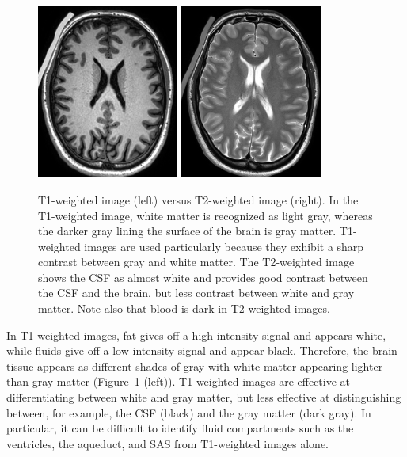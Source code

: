 \begin{figure}
  \centering
  \includegraphics[width=0.415\textwidth]{./graphics/chp2/T1-image.png}
  \includegraphics[width=0.415\textwidth]{./graphics/chp2/T2-image.png}
  \caption{T1-weighted image (left) versus T2-weighted image (right).
    In the T1-weighted image, white matter is recognized as light
    gray, whereas the darker gray lining the surface of the brain is
    gray matter. T1-weighted images are used particularly because they
    exhibit a sharp contrast between gray and white matter.  The
    T2-weighted image shows the CSF as almost white and provides good
    contrast between the CSF and the brain, but less contrast between
    white and gray matter. Note also that blood is dark in
    T2-weighted images.}
  \label{fig:chp2:t1vt2}
\end{figure}
In T1-weighted images, fat gives off a high intensity signal and
appears white, while fluids give off a low intensity signal and appear
black. Therefore, the brain tissue appears as different shades of gray
with white matter appearing lighter than gray matter
(Figure~\ref{fig:chp2:t1vt2} (left)). T1-weighted images are effective
at differentiating between white and gray matter, but less effective
at distinguishing between, for example, the CSF (black) and the gray
matter (dark gray). In particular, it can be difficult to identify
fluid compartments such as the ventricles, the aqueduct, and SAS from
T1-weighted images alone.

